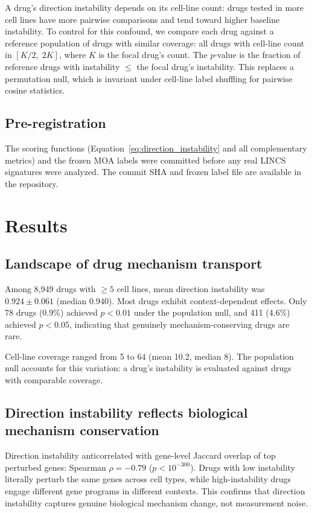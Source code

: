 \documentclass{article}
\begin{document}
A drug's direction instability depends on its cell-line count: drugs tested
in more cell lines have more pairwise comparisons and tend toward higher
baseline instability. To control for this confound, we compare each drug
against a reference population of drugs with similar coverage: all drugs
with cell-line count in $[K/2,\; 2K]$, where $K$ is the focal drug's count.
The $p$-value is the fraction of reference drugs with instability $\leq$
the focal drug's instability. This replaces a permutation null, which
is invariant under cell-line label shuffling for pairwise cosine statistics.

\subsection{Pre-registration}

The scoring functions (Equation~\ref{eq:direction_instability} and all
complementary metrics) and the frozen MOA labels were committed before any
real LINCS signatures were analyzed. The commit SHA and frozen label file
are available in the repository.

\section{Results}

\subsection{Landscape of drug mechanism transport}

Among 8{,}949 drugs with $\geq5$ cell lines, mean direction instability
was $0.924 \pm 0.061$ (median 0.940). Most drugs exhibit context-dependent
effects. Only 78 drugs (0.9\%) achieved $p < 0.01$ under the population
null, and 411 (4.6\%) achieved $p < 0.05$, indicating that genuinely
mechanism-conserving drugs are rare.

Cell-line coverage ranged from 5 to 64 (mean 10.2, median 8). The
population null accounts for this variation: a drug's instability is
evaluated against drugs with comparable coverage.

\subsection{Direction instability reflects biological mechanism conservation}

Direction instability anticorrelated with gene-level Jaccard overlap of
top perturbed genes: Spearman $\rho = -0.79$ ($p < 10^{-300}$). Drugs with
low instability literally perturb the same genes across cell types, while
high-instability drugs engage different gene programs in different contexts.
This confirms that direction instability captures genuine biological
mechanism change, not measurement noise.
\end{document}
